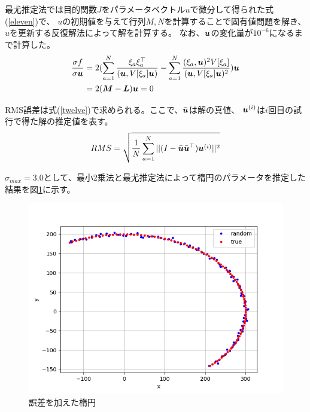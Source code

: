 \documentclass[]{jarticle}          %
\begin{document}
最尤推定法では目的関数$J$をパラメータベクトル$u$で微分して得られた式(\ref{eleven})で、
$u$の初期値を与えて行列$M,N$を計算することで固有値問題を解き、$u$を更新する反復解法によって解を計算する。
なお、$\mbox{\boldmath $u$}$の変化量が$10^{-6}$になるまで計算した。
\begin{equation}
  \begin{split}
    \frac{\sigma{f}}{\sigma{\mbox{\boldmath $u$}}}&=2(\sum^N_{a=1}\frac{\xi_a\xi_a^{\top}}{(\mbox{\boldmath $u$},V[\xi_a]\mbox{\boldmath $u$})}-\sum^N_{a=1}\frac{(\xi_a,\mbox{\boldmath $u$})^2V[\xi_a]}{(\mbox{\boldmath $u$},V[\xi_a]\mbox{\boldmath $u$})^2})\mbox{\boldmath $u$}\\
    &=2(\mbox{\boldmath $M$}-\mbox{\boldmath $L$})\mbox{\boldmath $u$}=0
  \end{split}
  \label{eleven}
\end{equation}

RMS誤差は式(\ref{twelve})で求められる。ここで、$\bar{\mbox{\boldmath $u$}}$は解の真値、
$\mbox{\boldmath $u$}^{(i)}$は$i$回目の試行で得た解の推定値を表す。
\begin{equation}
  RMS = \sqrt{\frac{1}{N}\sum^N_{a=1}||(I-\bar{\mbox{\boldmath $u$}}\bar{\mbox{\boldmath $u$}}^{\top})\mbox{\boldmath $u$}^{(i)}||^2}
  \label{twelve}
\end{equation}

$\sigma_{max}=3.0$として、最小2乗法と最尤推定法によって楕円のパラメータを推定した結果を図\ref{figthree}に示す。
\begin{figure}[!ht]
  \begin{center}
    \includegraphics[keepaspectratio, width=0.7\linewidth]{figures/kadai3.png}
  \end{center}
  \caption{誤差を加えた楕円}
  \label{figthree}
\end{figure}
\end{document}
